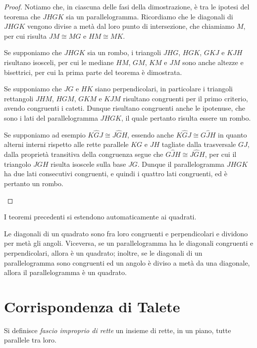 \begin{proof}
Notiamo che, in ciascuna delle fasi della dimostrazione, è tra le ipotesi del teorema che $JHGK$ sia un parallelogramma. Ricordiamo che le diagonali di $JHGK$ vengono divise a metà dal loro punto di intersezione, che chiamiamo $M$, per cui risulta $JM\cong MG$ e $HM\cong MK$.
\begin{enumeratea}
\item Se supponiamo che $JHGK$ sia un rombo, i triangoli $JHG$, $HGK$, $GKJ$ e $KJH$ risultano isosceli, per cui le mediane $HM$, $GM$, $KM$ e $JM$ sono anche altezze e bisettrici, per cui la prima parte del teorema è dimostrata.
\item Se supponiamo che $JG$ e $HK$ siano perpendicolari, in particolare i triangoli rettangoli $JHM$, $HGM$, $GKM$ e $KJM$ risultano congruenti per il primo criterio, avendo congruenti i cateti. Dunque risultano congruenti anche le ipotenuse, che sono i lati del parallelogramma $JHGK$, il quale pertanto risulta essere un rombo.
\item Se supponiamo ad esempio $K\widehat{G}J\cong J\widehat{G}H$, essendo anche $K\widehat{G}J\cong G\widehat{J}H$ in quanto alterni interni rispetto alle rette parallele $KG$ e $JH$ tagliate dalla trasversale $GJ$, dalla proprietà transitiva della congruenza segue che $G\widehat{J}H\cong J\widehat{G}H$, per cui il triangolo $JGH$ risulta isoscele sulla base $JG$. Dunque il parallelogramma $JHGK$ ha due lati consecutivi congruenti, e quindi i quattro lati congruenti, ed è pertanto un rombo.
\end{enumeratea}
\end{proof}

I teoremi precedenti si estendono automaticamente ai quadrati.
\begin{corollario}
Le diagonali di un quadrato sono fra loro congruenti e perpendicolari e dividono per metà gli angoli. Viceversa, se un parallelogramma ha le diagonali congruenti e perpendicolari, allora è un quadrato; inoltre, se le diagonali di un parallelogramma sono congruenti ed un angolo è diviso a metà da una diagonale, allora il parallelogramma è un quadrato.
\end{corollario}

\section{Corrispondenza di Talete}

\begin{definizione}
Si definisce \emph{fascio improprio di rette} un insieme di rette, in un piano, tutte parallele tra loro.
\end{definizione}

